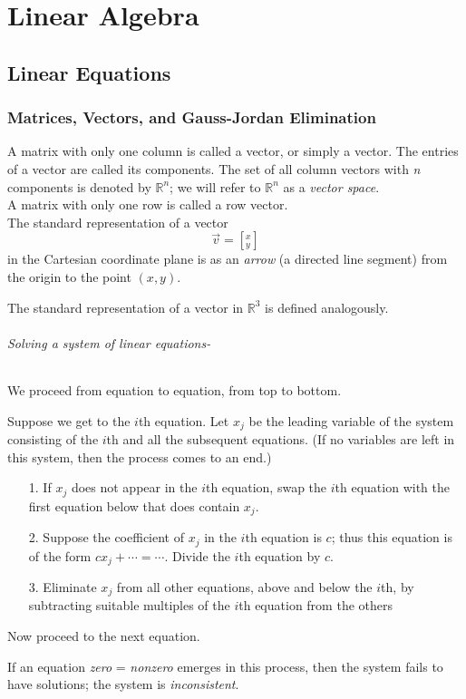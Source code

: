 \documentclass[10pt]{report}
\begin{document}
\part{Linear Algebra}
\chapter{Linear Equations}
\section{Matrices, Vectors, and Gauss-Jordan Elimination}
A matrix with only one column is called a vector, or simply a vector. The entries of a vector are called its components. The set of all column vectors with \textit{n} components is denoted by $\mathbb{R}^n$; we will refer to $\mathbb{R}^n$ as a \textit{vector space}.\\
A matrix with only one row is called a row vector.\\
The standard representation of a vector 
$$\vec{v}=\left[_y^x\right]$$
in the Cartesian coordinate plane is as an \textit{arrow} (a directed line segment) from the origin to the point $(x,y)$.

The standard representation of a vector in $\mathbb{R}^3$ is defined analogously.
\paragraph{Solving a system of linear equations-}
We proceed from equation to equation, from top to bottom.

Suppose we get to the $i$th equation. Let $x_j$ be the leading variable of the system consisting of the $i$th and all the subsequent equations. (If no variables are left in this system, then the process comes to an end.)
\begin{itemize}
\item[1.] If $x_j$ does not appear in the $i$th equation, swap the $i$th equation with the first equation below that does contain $x_j$.
\item[2.] Suppose the coefficient of $x_j$ in the $i$th equation is $c$; thus this equation is of the form $cx_j + \cdots = \cdots$. Divide the $i$th equation by $c$.
\item[3.] Eliminate $x_j$ from all other equations, above and below the $i$th, by subtracting suitable multiples of the $i$th equation from the others
\end{itemize}
Now proceed to the next equation.

If an equation \textit{zero} = \textit{nonzero} emerges in this process, then the system fails to have solutions; the system is \textit{inconsistent}.
\end{document}
